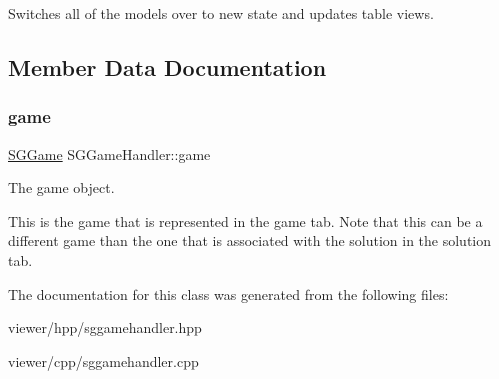 Switches all of the models over to new state and updates table views. 

\subsection{Member Data Documentation}
\mbox{\label{classSGGameHandler_ac95a8d363c98979cbbd8fc63a112bf11}} 
\subsubsection{\texorpdfstring{game}{game}}
{\footnotesize\ttfamily \hyperlink{classSGGame}{S\+G\+Game} S\+G\+Game\+Handler\+::game\hspace{0.3cm}{\ttfamily [private]}}



The game object. 

This is the game that is represented in the game tab. Note that this can be a different game than the one that is associated with the solution in the solution tab. 

The documentation for this class was generated from the following files\+:\begin{DoxyCompactItemize}
\item 
viewer/hpp/sggamehandler.\+hpp\item 
viewer/cpp/sggamehandler.\+cpp\end{DoxyCompactItemize}
